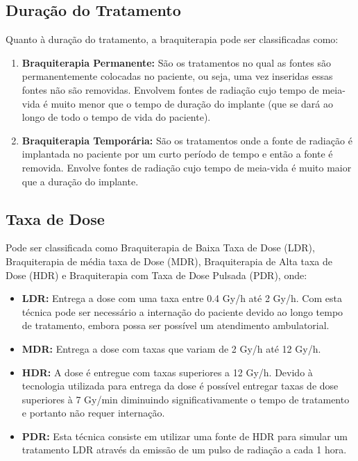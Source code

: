 \documentclass[11pt,a4paper]{article}
\begin{document}
		\subsection{Duração do Tratamento}

			Quanto à duração do tratamento, a braquiterapia pode ser classificadas como:

			\begin{enumerate}

				\item \textbf{Braquiterapia Permanente:}  São os tratamentos no qual as fontes são permanentemente colocadas no paciente, ou seja, uma vez inseridas essas fontes não são removidas. Envolvem fontes de radiação cujo tempo de meia-vida é muito menor que o tempo de duração do implante (que se dará ao longo de todo o tempo de vida do paciente).
				
				\item \textbf{Braquiterapia Temporária:} São os tratamentos onde a fonte de radiação é implantada no paciente por um curto período de tempo e então a fonte é removida. Envolve fontes de radiação cujo tempo de meia-vida é muito maior que a duração do implante.
				
			\end{enumerate}

		\subsection{Taxa de Dose}

			Pode ser classificada como Braquiterapia de Baixa Taxa de Dose (LDR), Braquiterapia de média taxa de Dose (MDR), Braquiterapia de Alta taxa de Dose (HDR) e Braquiterapia com Taxa de Dose Pulsada (PDR), onde:

			\begin{itemize}
				\item \textbf{LDR:} Entrega a dose com uma taxa entre 0.4 Gy/h até 2 Gy/h. Com esta técnica pode ser necessário a internação do paciente devido ao longo tempo de tratamento, embora possa ser possível um atendimento ambulatorial.
				\item \textbf{MDR:} Entrega a dose com taxas que variam de 2 Gy/h até 12 Gy/h.
				\item  \textbf{HDR:} A dose é entregue com taxas superiores a 12 Gy/h. Devido à tecnologia utilizada para entrega da dose é possível entregar taxas de dose superiores à 7 Gy/min diminuindo significativamente o tempo de tratamento e portanto não requer internação. 
				\item \textbf{PDR:} Esta técnica consiste em utilizar uma fonte de HDR para simular um tratamento LDR através da emissão de um pulso de radiação a cada 1 hora.
			\end{itemize}
\end{document}
